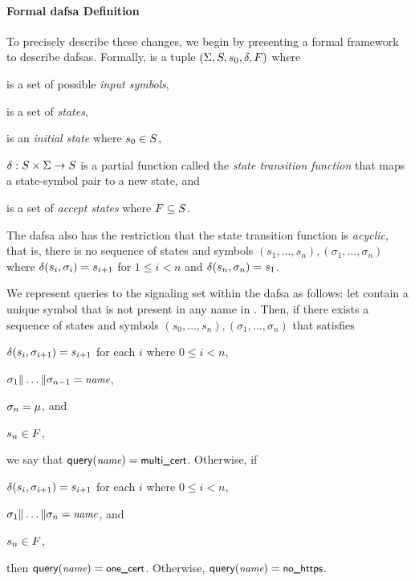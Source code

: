 \paragraph{Formal \ac{dafsa} Definition}
To precisely describe these changes, we begin by presenting a formal framework
to describe \acp{dafsa}. Formally,  is a tuple $(\Sigma, S,
s_0, \delta, F)$ where
\begin{inparaenum}
\item \symbols is a set of possible \emph{input symbols},
\item \states is a set of \emph{states},
\item \initstate is an \emph{initial state} where $s_0 \in S$,
\item $\delta: S \times \Sigma \to S$ is a partial function
  called the \emph{state transition function} that maps a state-symbol pair to a
  new state, and
\item \finalstates is a set of \emph{accept states} where $F
  \subseteq S$.
\end{inparaenum}
The \ac{dafsa} also has the restriction that the state transition function is
\emph{acyclic}, that is, there is no sequence of states and symbols $(s_1,
\ldots, s_n), (\sigma_1, \ldots, \sigma_n)$ where $\delta(s_i, \sigma_i) =
s_{i+1}$ for $1 \le i < n$ and $\delta(s_n, \sigma_n) = s_1$.

We represent queries to the signaling set within the \ac{dafsa} as follows: let
\symbols contain a unique symbol \multicertsymbol that is not present in any
name in \httpsset. Then, if there exists a sequence of
states and symbols $(s_0, \ldots, s_n), (\sigma_1, \ldots, \sigma_n)$ that
satisfies
\begin{inparaenum}
\item $\delta(s_i, \sigma_{i+1}) = s_{i+1}$ for each $i$ where $0 \le i < n$,
\item $\sigma_1 \| \dots \| \sigma_{n-1} = \small{\emph{name}}$, 
\item $\sigma_n = \mu$, and
\item $s_n \in F$,
\end{inparaenum}
we say that $\textsf{query}(\small{\emph{name}}) = \textsf{multi\_cert}$.
Otherwise, if
\begin{inparaenum}
\item $\delta(s_i, \sigma_{i+1}) = s_{i+1}$ for each $i$ where $0 \le i < n$,
\item $\sigma_1 \| \dots \| \sigma_{n} = \small{\emph{name}}$, and
\item $s_n \in F$,
\end{inparaenum}
then $\textsf{query}(\small{\emph{name}}) = \textsf{one\_cert}$. Otherwise, $\textsf{query}(\small{\emph{name}}) = \textsf{no\_https}$.

